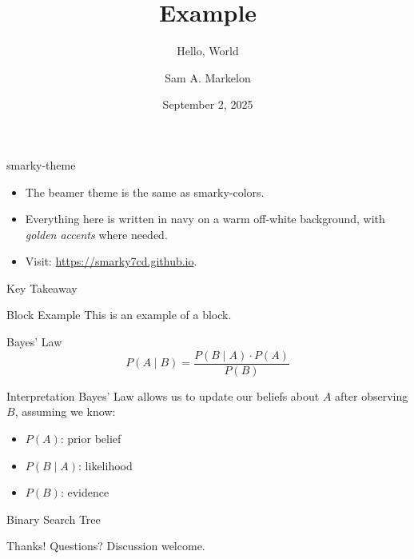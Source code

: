 \documentclass{beamer}
\title{Example}
\subtitle{Hello, World}
\author{Sam A. Markelon}
\date{September 2, 2025}
\begin{document}
\begin{frame}[plain]
  \centering
  \vspace*{2cm}
  {\LARGE \inserttitle\par}
  \vspace{0.5em}
  {\Large \insertsubtitle\par}
  \vspace{1em}
  {\large \insertauthor\par}
  \vspace{0.5em}
  {\normalsize \insertdate\par}
\end{frame}

\begin{frame}{smarky-theme}
\begin{itemize}
  \item The beamer theme is the same as smarky-colors.
  \item Everything here is written in navy on a warm off-white background, with \emph{golden accents} where needed.
  \item Visit: \url{https://smarky7cd.github.io}. 
\end{itemize}
\end{frame}

\begin{frame}{Key Takeaway}
\begin{block}{Block Example}
This is an example of a block.
\end{block}
\end{frame}

\begin{frame}{Bayes' Law}
\[
P(A \mid B) = \frac{P(B \mid A) \cdot P(A)}{P(B)}
\]
\pause
\begin{block}{Interpretation}
Bayes’ Law allows us to update our beliefs about \(A\) after observing \(B\), assuming we know:
\begin{itemize}
  \item \(P(A)\): prior belief
  \item \(P(B \mid A)\): likelihood
  \item \(P(B)\): evidence
\end{itemize}
\end{block}
\end{frame}

\begin{frame}{Binary Search Tree}
\centering
{}
\end{frame}

\begin{frame}{Thanks!}
  Questions? Discussion welcome.
\end{frame}
\end{document}
